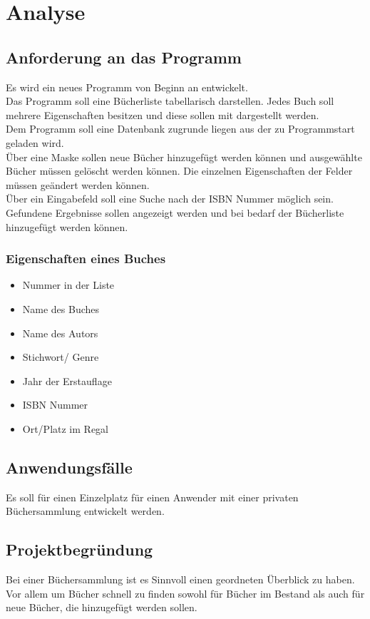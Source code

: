 
\section{Analyse}

\subsection{Anforderung an das Programm}
Es wird ein neues Programm von Beginn an entwickelt.\\
Das Programm soll eine Bücherliste tabellarisch darstellen.
Jedes Buch soll mehrere Eigenschaften besitzen und diese sollen mit dargestellt werden.
\\
Dem Programm soll eine Datenbank zugrunde liegen aus der zu Programmstart geladen wird.\\
Über eine Maske sollen neue Bücher hinzugefügt werden können und ausgewählte Bücher müssen gelöscht werden können. Die einzelnen Eigenschaften der Felder müssen geändert werden können.
\\ 
Über ein Eingabefeld soll eine Suche nach der ISBN Nummer möglich sein.\\
Gefundene Ergebnisse sollen angezeigt werden und bei bedarf der Bücherliste hinzugefügt werden können.\\

\subsubsection{Eigenschaften eines Buches}

\begin{itemize}
\item{Nummer in der Liste}
\item{Name des Buches}
\item{Name des Autors}
\item{Stichwort/ Genre}
\item{Jahr der Erstauflage}
\item{ISBN Nummer}
\item{Ort/Platz im Regal}

\end{itemize}

\subsection{Anwendungsfälle}
Es soll für einen Einzelplatz für einen Anwender mit einer privaten Büchersammlung entwickelt werden.

\subsection{Projektbegründung}
Bei einer Büchersammlung ist es Sinnvoll einen geordneten Überblick zu haben.
Vor allem um Bücher schnell zu finden sowohl für Bücher im Bestand als auch für neue Bücher, die hinzugefügt werden sollen.

